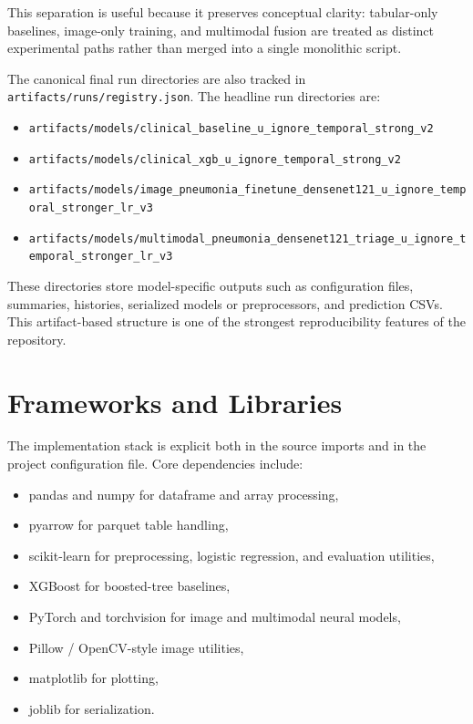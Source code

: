 This separation is useful because it preserves conceptual clarity: tabular-only baselines, image-only training, and multimodal fusion are treated as distinct experimental paths rather than merged into a single monolithic script.

The canonical final run directories are also tracked in \texttt{artifacts/runs/registry.json}. The headline run directories are:

\begin{itemize}
    \item \texttt{artifacts/models/clinical\_baseline\_u\_ignore\_temporal\_strong\_v2}
    \item \texttt{artifacts/models/clinical\_xgb\_u\_ignore\_temporal\_strong\_v2}
    \item \texttt{artifacts/models/image\_pneumonia\_finetune\_densenet121\_u\_ignore\_temporal\_stronger\_lr\_v3}
    \item \texttt{artifacts/models/multimodal\_pneumonia\_densenet121\_triage\_u\_ignore\_temporal\_stronger\_lr\_v3}
\end{itemize}

These directories store model-specific outputs such as configuration files, summaries, histories, serialized models or preprocessors, and prediction CSVs. This artifact-based structure is one of the strongest reproducibility features of the repository.

\section{Frameworks and Libraries}

The implementation stack is explicit both in the source imports and in the project configuration file. Core dependencies include:

\begin{itemize}
    \item pandas and numpy for dataframe and array processing,
    \item pyarrow for parquet table handling,
    \item scikit-learn for preprocessing, logistic regression, and evaluation utilities,
    \item XGBoost for boosted-tree baselines,
    \item PyTorch and torchvision for image and multimodal neural models,
    \item Pillow / OpenCV-style image utilities,
    \item matplotlib for plotting,
    \item joblib for serialization.
\end{itemize}

